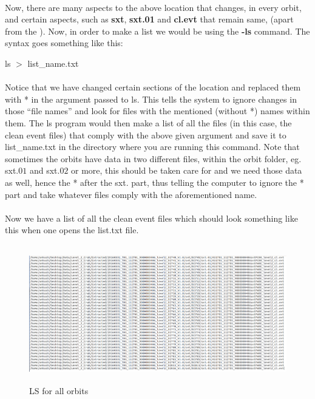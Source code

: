 \documentclass[a4paper,twoside]{report}
\numberwithin{equation}{section}
\begin{document}
\paragraph{}
Now, there are many aspects to the above location that changes, in every orbit, and certain aspects, such as \textbf{sxt}, \textbf{sxt.01} and \textbf{cl.evt} that remain same, (apart from the ). Now, in order to make a list we would be using the \textbf{-ls} command. The syntax goes something like this:
\begin{center}
\item ls  $>$ list\_name.txt
\end{center}
\paragraph{}
Notice that we have changed certain sections of the location and replaced them with * in the argument passed to ls. This tells the system to ignore changes in those “file names” and look for files with the mentioned (without *) names within them. The ls program would then make a list of all the files (in this case, the clean event files) that comply with the above given argument and save it to list\_name.txt in the directory where you are running this command. Note that sometimes the orbits have data in two different files, within the orbit folder, eg. sxt.$01$ and sxt.$02$ or more, this should be taken care for and we need those data as well, hence the * after the sxt. part, thus telling the computer to ignore the * part and take whatever files comply with the aforementioned name. 
\newpage
\paragraph{}
Now we have a list of all the clean event files which should look something like this when one opens the list.txt file. 
\begin{figure}[h]
\includegraphics[width=1.0\linewidth, height=6cm]{Ls_all.jpg}
\caption{LS for all orbits}
\label{ls_all}
\end{figure}
\end{document}
